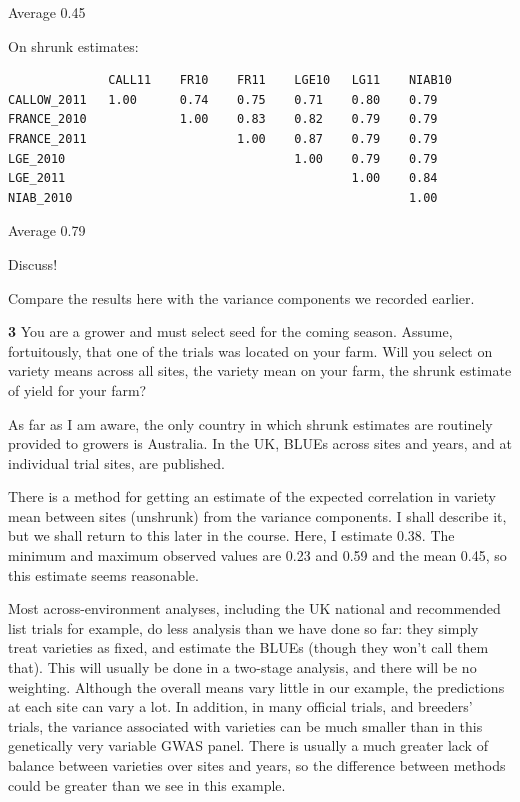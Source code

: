 \documentclass[
]{book}
\makeatletter
\newenvironment{kframe}{%
\medskip{}
\setlength{\fboxsep}{.8em}
 \def\at@end@of@kframe{}%
 \ifinner\ifhmode%
  \def\at@end@of@kframe{\end{minipage}}%
  \begin{minipage}{\columnwidth}%
 \fi\fi%
 \def\FrameCommand##1{\hskip\@totalleftmargin \hskip-\fboxsep
 \colorbox{shadecolor}{##1}\hskip-\fboxsep
     \hskip-\linewidth \hskip-\@totalleftmargin \hskip\columnwidth}%
 \MakeFramed {\advance\hsize-\width
   \@totalleftmargin\z@ \linewidth\hsize
   \@setminipage}}%
 {\par\unskip\endMakeFramed%
 \at@end@of@kframe}
\newenvironment{rmdblock}[1]
  {
  \begin{itemize}
  \renewcommand{\labelitemi}{
    \raisebox{-.7\height}[0pt][0pt]{
      {\setkeys{Gin}{width=3em,keepaspectratio}\texttt{[image: images/\#1]}}
    }
  }
  \setlength{\fboxsep}{1em}
  \begin{kframe}
  \item
  }
  {
  \end{kframe}
  \end{itemize}
  }
\newenvironment{rmdquiz}
  {\begin{rmdblock}{quiz}}
  {\end{rmdblock}}
\makeatother
\begin{document}
Average 0.45

On shrunk estimates:

\begin{verbatim}
              CALL11    FR10    FR11    LGE10   LG11    NIAB10
CALLOW_2011   1.00      0.74    0.75    0.71    0.80    0.79
FRANCE_2010             1.00    0.83    0.82    0.79    0.79
FRANCE_2011                     1.00    0.87    0.79    0.79
LGE_2010                                1.00    0.79    0.79
LGE_2011                                        1.00    0.84
NIAB_2010                                               1.00
\end{verbatim}

Average 0.79

Discuss!

Compare the results here with the variance components we recorded earlier.

\begin{rmdquiz}
\textbf{3} You are a grower and must select seed for the coming season. Assume, fortuitously, that one of the trials was located on your farm. Will you select on variety means across all sites, the variety mean on your farm, the shrunk estimate of yield for your farm?
\end{rmdquiz}

As far as I am aware, the only country in which shrunk estimates are routinely provided to growers is Australia. In the UK, BLUEs across sites and years, and at individual trial sites, are published.

There is a method for getting an estimate of the expected correlation in variety mean between sites (unshrunk) from the variance components. I shall describe it, but we shall return to this later in the course. Here, I estimate 0.38. The minimum and maximum observed values are 0.23 and 0.59 and the mean 0.45, so this estimate seems reasonable.

Most across-environment analyses, including the UK national and recommended list trials for example, do less analysis than we have done so far: they simply treat varieties as fixed, and estimate the BLUEs (though they won't call them that). This will usually be done in a two-stage analysis, and there will be no weighting. Although the overall means vary little in our example, the predictions at each site can vary a lot. In addition, in many official trials, and breeders' trials, the variance associated with varieties can be much smaller than in this genetically very variable GWAS panel. There is usually a much greater lack of balance between varieties over sites and years, so the difference between methods could be greater than we see in this example.
\end{document}
